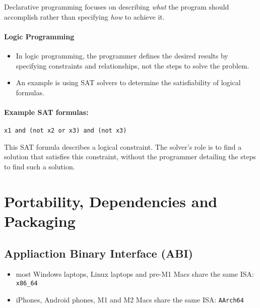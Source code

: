 \documentclass[12pt]{article}
\begin{document}
Declarative programming focuses on describing \textit{what} the program should accomplish rather than specifying \textit{how} to achieve it.

\paragraph{Logic Programming}
\begin{itemize}
    \item In logic programming, the programmer defines the desired results by specifying constraints and relationships, not the steps to solve the problem.
    \item An example is using SAT solvers to determine the satisfiability of logical formulas.
\end{itemize}


\paragraph{Example SAT formulas:}

\begin{lstlisting}
x1 and (not x2 or x3) and (not x3)
\end{lstlisting}
This SAT formula describes a logical constraint. The solver's role is to find a solution that satisfies this constraint, without the programmer detailing the steps to find such a solution.




















\newpage
\section{Portability, Dependencies and Packaging}

\subsection{Appliaction Binary Interface (ABI)}

\begin{itemize}
    \item most Windows laptops, Linux laptops and pre-M1 Macs share the same ISA: \texttt{x86\_64}
    \item iPhones, Android phones, M1 and M2 Macs share the same ISA: \texttt{AArch64}
\end{itemize}
\end{document}
